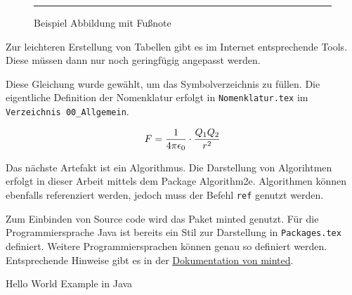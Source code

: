 \begin{figure}[h]
\centering
\rule{.5\textwidth}{1cm}
\caption[{Beispiel Abbildung}]{Beispiel Abbildung mit Fußnote\protect\footnotemark}
\label{fig:example}
\end{figure}

Zur leichteren Erstellung von Tabellen gibt es im Internet entsprechende Tools. 
Diese müssen dann nur noch geringfügig angepasst werden. 



Diese Gleichung wurde gewählt, um das Symbolverzeichnis zu füllen. 
Die eigentliche Definition der Nomenklatur erfolgt in \texttt{Nomenklatur.tex} im \texttt{Verzeichnis 00\_Allgemein}.

\begin{equation}
    \label{eq:culomb}
    \equationentry{Coulomb-Gesetz}
    F = \frac{1}{4\pi\epsilon_0}\cdot\frac{Q_1Q_2}{r^2}
\end{equation}

Das nächste Artefakt ist ein Algorithmus.
Die Darstellung von Algorihtmen erfolgt in dieser Arbeit mittels dem Package Algorithm2e.
Algorithmen können ebenfalls referenziert werden, jedoch muss der Befehl \texttt{ref} genutzt werden.



Zum Einbinden von Source code wird das Paket minted genutzt. 
Für die Programmiersprache Java ist bereits ein Stil zur Darstellung in \texttt{Packages.tex} definiert.
Weitere Programmiersprachen können genau so definiert werden. Entsprechende Hinweise gibt es in der 
\href{https://www.ctan.org/pkg/minted}{Dokumentation von minted}.

\begin{listing}[h]
\caption{Hello World Example in Java}
\label{listing:1}
\inputminted{java}{04_Artefakte/03_Listings/HelloWorld.java}
\end{listing}

\blinddocument


